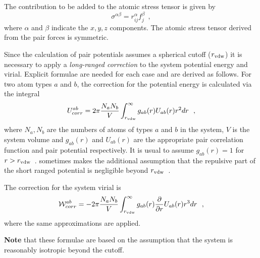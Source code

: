 The contribution to be added to the atomic stress tensor is
given by
\begin{equation}
\sigma^{\alpha \beta} = r_{ij}^{\alpha}f_{j}^{\beta}~~,
\end{equation}
where $\alpha$ and $\beta$ indicate the $x,y,z$ components.  The
atomic stress tensor derived from the pair
forces is symmetric.

Since the calculation of pair potentials assumes a spherical
cutoff ($r_{\rm vdw}$) it is necessary to apply a {\em long-ranged
correction} to the
system potential energy and virial.  Explicit formulae are needed
for each case and are derived as follows.  For two atom types $a$
and $b$, the correction for the potential energy is calculated via
the integral
\begin{equation}
U_{corr}^{ab} = 2\pi
\frac{N_{a}N_{b}}{V}\int_{r_{\rm vdw}}^{\infty}g_{ab}(r)U_{ab}(r)r^{2}dr~~,
\end{equation}
where $N_{a},N_{b}$ are the numbers of atoms of types $a$ and $b$
in the system, $V$ is the system volume and $g_{ab}(r)$ and
$U_{ab}(r)$ are the appropriate pair correlation function and pair
potential respectively.  It is usual to assume $g_{ab}(r)=1$ for
$r>r_{\rm vdw}$~.  \D sometimes makes the additional assumption that
the repulsive part of the short ranged potential is negligible
beyond $r_{\rm vdw}$~.

The correction for the system virial is
\begin{equation}
{\cal W}_{corr}^{ab} = -2\pi \frac{N_{a}N_{b}}{V}
\int_{r_{\rm vdw}}^{\infty}g_{ab}(r) \frac{\partial}{\partial
r}U_{ab}(r)r^{3}dr~~,
\end{equation}
where the same approximations are applied.

{\bf Note} that these formulae are based on the assumption that the
system is reasonably isotropic beyond the cutoff.

